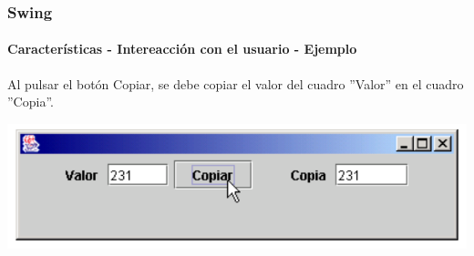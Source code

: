 \documentclass{beamer}
\begin{document}
	\begin{frame}
		\frametitle{Swing}
		\framesubtitle{Caracter\'isticas - Intereacci\'on con el usuario - Ejemplo}
        
        Al pulsar el bot\'on Copiar, se debe copiar el valor del cuadro ''Valor'' en el cuadro ''Copia''.
        \begin{center}
	        	\includegraphics[scale=.35]{images/copia.png}
	    \end{center}
	\end{frame}	

{ %
    \begin{frame}[plain]
    \end{frame}
}
\end{document}
